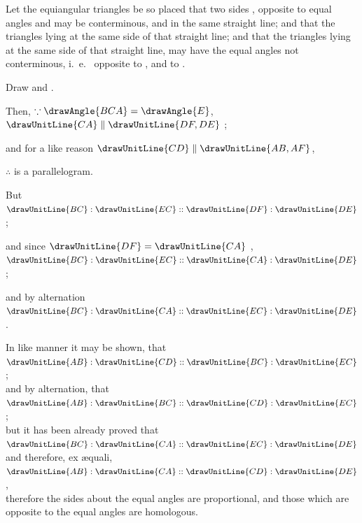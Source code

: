 \documentclass[booklanguage=english]{byrnebook}
\begin{document}
Let the equiangular triangles be so placed that two sides ,  opposite to equal angles  and  may be conterminous, and in the same straight line; and that the triangles lying at the same side of that straight line; and that the triangles lying at the same side of that straight line, may have the equal angles not conterminous, i.\ e.\  opposite to , and  to .

\begin{center}
Draw  and .

Then, $\because \drawAngle{BCA} = \drawAngle{E}$, $\drawUnitLine{CA} \parallel \drawUnitLine{DF,DE}$ ; %

and for a like reason $\drawUnitLine{CD} \parallel \drawUnitLine{AB,AF}$,

$\therefore$
is a parallelogram.

But $\drawUnitLine{BC} : \drawUnitLine{EC} :: \drawUnitLine{DF} : \drawUnitLine{DE}$ ;

and since $\drawUnitLine{DF} = \drawUnitLine{CA}$ ,\\
$\drawUnitLine{BC} : \drawUnitLine{EC} :: \drawUnitLine{CA} : \drawUnitLine{DE}$;

and by alternation $\drawUnitLine{BC} : \drawUnitLine{CA} :: \drawUnitLine{EC} : \drawUnitLine{DE}$ .

In like manner it may be shown, that\\
$\drawUnitLine{AB} : \drawUnitLine{CD} :: \drawUnitLine{BC} : \drawUnitLine{EC}$;\\
and by alternation, that\\
$\drawUnitLine{AB} : \drawUnitLine{BC} :: \drawUnitLine{CD} : \drawUnitLine{EC}$;\\
but it has been already proved that\\
$\drawUnitLine{BC} : \drawUnitLine{CA} :: \drawUnitLine{EC} : \drawUnitLine{DE}$\\
and therefore, ex \ae quali,\\
$\drawUnitLine{AB} : \drawUnitLine{CA} :: \drawUnitLine{CD} : \drawUnitLine{DE}$ ,\\
therefore the sides about the equal angles are proportional, and those which are opposite to the equal angles are homologous.
\end{center}
\end{document}
